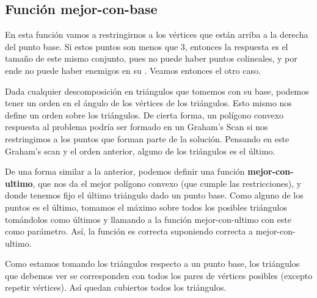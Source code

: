 \subsection{Función mejor-con-base}
\par{
En esta función vamos a restringirnos a los vértices que están arriba a la derecha del punto base.
Si estos puntos son menos que 3, entonces la respuesta es el tamaño de este mismo conjunto, pues no puede haber puntos colineales, y por ende no puede haber enemigos en su .
Veamos entonces el otro caso.}
\par{
Dada cualquier descomposición en triángulos que tomemos con su base, podemos tener un orden en el ángulo de los vértices de los triángulos. Esto mismo nos define un orden sobre los triángulos.
De cierta forma, un polígono convexo respuesta al problema podría ser formado en un Graham's Scan si nos restringimos a los puntos que forman parte de la solución. Pensando en este Graham's scan y el orden anterior, alguno de los triángulos es el último.}
\par{
De una forma similar a la anterior, podemos definir una función \textbf{mejor-con-ultimo}, que nos da el mejor polígono convexo (que cumple las restricciones), y donde tenemos fijo el último triángulo dado un punto base. Como alguno de los puntos es el último, tomamos el máximo sobre todos los posibles triángulos tomándolos como últimos y llamando a la función mejor-con-ultimo con este como parámetro. Así, la función es correcta suponiendo correcta a mejor-con-ultimo.}
\par{
Como estamos tomando los triángulos respecto a un punto base, los triángulos que debemos ver se corresponden con todos los pares de vértices posibles (excepto repetir vértices). Así quedan cubiertos todos los triángulos. }

